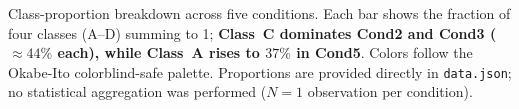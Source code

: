 \caption{Class-proportion breakdown across five conditions. Each bar shows the fraction of four classes (A--D) summing to 1; \textbf{Class~C dominates Cond2 and Cond3 (${\approx}44\%$ each), while Class~A rises to $37\%$ in Cond5}. Colors follow the Okabe-Ito colorblind-safe palette. Proportions are provided directly in \texttt{data.json}; no statistical aggregation was performed ($N=1$ observation per condition).}

